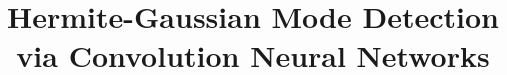 \documentclass[10pt,journal,compsoc]{IEEEtran}
\begin{document}
%
\title{Hermite-Gaussian Mode Detection via Convolution Neural Networks}



%
%
%
%

        
\end{document}
